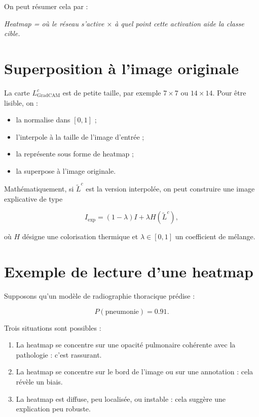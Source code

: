 ﻿\documentclass[11pt,a4paper]{article}
\begin{document}
On peut résumer cela par :

\begin{center}
\emph{Heatmap = où le réseau s'active $\times$ à quel point cette activation aide la classe cible.}
\end{center}

\section{Superposition à l'image originale}

La carte $L_{\mathrm{GradCAM}}^c$ est de petite taille, par exemple $7 \times 7$ ou $14 \times 14$. Pour être lisible, on :
\begin{itemize}
    \item la normalise dans $[0,1]$ ;
    \item l'interpole à la taille de l'image d'entrée ;
    \item la représente sous forme de heatmap ;
    \item la superpose à l'image originale.
\end{itemize}

Mathématiquement, si $\widetilde{L}^c$ est la version interpolée, on peut construire une image explicative de type

\[
I_{\mathrm{exp}} = (1-\lambda)I + \lambda H(\widetilde{L}^c),
\]

où $H$ désigne une colorisation thermique et $\lambda \in [0,1]$ un coefficient de mélange.

\section{Exemple de lecture d'une heatmap}

Supposons qu'un modèle de radiographie thoracique prédise :

\[
P(\text{pneumonie})=0.91.
\]

Trois situations sont possibles :

\begin{enumerate}[label=\arabic*)]
    \item La heatmap se concentre sur une opacité pulmonaire cohérente avec la pathologie : c'est rassurant.
    \item La heatmap se concentre sur le bord de l'image ou sur une annotation : cela révèle un biais.
    \item La heatmap est diffuse, peu localisée, ou instable : cela suggère une explication peu robuste.
\end{enumerate}
\end{document}
